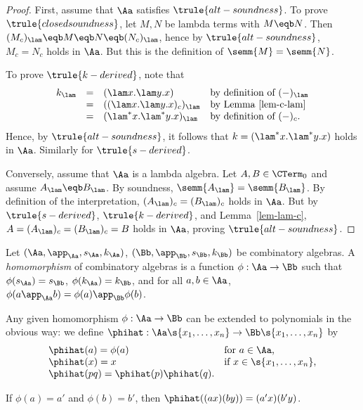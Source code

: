 \documentclass[12pt]{article}
\begin{document}
\begin{proof}
  First, assume that $\Aa$ satisfies $\trule{alt-soundness}$. To prove
  $\trule{closed soundness}$, let $M,N$ be lambda terms with $M\eqb
  N$. Then $(M_c)_\lam \eqb M\eqb N\eqb (N_c)_\lam$, hence by
  $\trule{alt-soundness}$, $M_c=N_c$ holds in $\Aa$. But this is the
  definition of $\semm{M}=\semm{N}$. 
  
  To prove $\trule{k-derived}$, note that 
  \[\begin{array}{llll}
    k_\lam &=& (\lam x.\lam y.x) &\mbox{by definition of $(-)_\lam$} \\
    &=& ((\lam x.\lam y.x)_c)_\lam &\mbox{by Lemma~\ref{lem-c-lam}}\\
    &=& (\lam^* x.\lam^* y.x)_\lam &\mbox{by definition of $(-)_c$}.
  \end{array}
  \]
  Hence, by $\trule{alt-soundness}$, it follows that $k=(\lam^*
  x.\lam^* y.x)$ holds in $\Aa$. Similarly for $\trule{s-derived}$.
  
  Conversely, assume that $\Aa$ is a lambda algebra. Let
  $A,B\in\CTerm_0$ and assume $A_\lam\eqb B_\lam$. By soundness,
  $\semm{A_\lam}=\semm{B_\lam}$. By definition of the interpretation,
  $(A_\lam)_c=(B_\lam)_c$ holds in $\Aa$. But by $\trule{s-derived}$,
  $\trule{k-derived}$, and Lemma~\ref{lem-lam-c},
  $A=(A_\lam)_c=(B_\lam)_c=B$ holds in $\Aa$, proving
  $\trule{alt-soundness}$.\eot
\end{proof}

\begin{definition}[Homomorphism]
  Let $(\Aa,\app_\Aa,s_\Aa,k_\Aa)$, $(\Bb,\app_\Bb,s_\Bb,k_\Bb)$ be
  combinatory algebras.  A {\em homomorphism} of combinatory algebras
  is a function $\phi:\Aa\to\Bb$ such that $\phi(s_\Aa)=s_\Bb$,
  $\phi(k_\Aa)=k_\Bb$, and for all $a,b\in\Aa$, $\phi(a\app_\Aa
  b)=\phi(a)\app_\Bb \phi(b)$.
\end{definition}

Any given homomorphism $\phi:\Aa\to\Bb$ can be extended to polynomials
in the obvious way: we define
$\phihat:\Aa\s{x_1,\ldots,x_n}\to\Bb\s{x_1,\ldots,x_n}$ by
\[\begin{array}{ll}
  \phihat(a)=\phi(a) & \mbox{for $a\in\Aa$,}\\
  \phihat(x)=x       & \mbox{if $x\in\s{x_1,\ldots,x_n}$,}\\
  \phihat(pq)=\phihat(p)\phihat(q). \\
\end{array}
\]

\begin{example}
  If $\phi(a)=a'$ and $\phi(b)=b'$, then $\phihat((ax)(by)) = (a'x)(b'y)$. 
\end{example}
\end{document}
